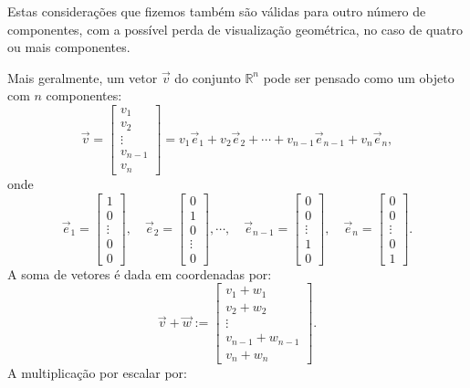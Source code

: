 Estas considerações que fizemos também são válidas para outro número de componentes, com a possível perda de visualização geométrica, no caso de quatro ou mais componentes.

Mais geralmente, um vetor $\vec{v}$ do conjunto $\mathbb{R}^n$ pode ser pensado como um objeto com $n$ componentes:
\begin{equation}
\vec{v} =
\left[
  \begin{array}{c}
    v_1 \\
    v_2 \\
   \vdots \\
    v_{n-1} \\
    v_n
  \end{array}
\right]
= v_1 \vec{e}_1 + v_2 \vec{e}_2 + \cdots + v_{n-1} \vec{e}_{n-1} + v_{n} \vec{e}_{n},
\end{equation} onde
\begin{equation}
\vec{e}_1 =
\left[
  \begin{array}{c}
    1 \\
    0 \\
  \vdots \\
    0 \\
    0
  \end{array}
\right], \quad
\vec{e}_2 =
\left[
  \begin{array}{c}
    0 \\
    1 \\
    0 \\
  \vdots \\
    0
  \end{array}
\right],   \cdots, \quad
\vec{e}_{n-1} =
\left[
  \begin{array}{c}
    0 \\
    0 \\
  \vdots \\
    1 \\
    0
  \end{array}
\right], \quad
\vec{e}_n =
\left[
  \begin{array}{c}
    0 \\
    0 \\
  \vdots \\
    0 \\
    1
  \end{array}
\right].
\end{equation} A soma de vetores é dada em coordenadas por:
\begin{equation}
\vec{v} + \vec{w} :=
\left[
  \begin{array}{c}
    v_1 + w_1 \\
    v_2 + w_2 \\
    \vdots \\
    v_{n-1} + w_{n-1} \\
    v_n + w_n
  \end{array}
\right].
\end{equation} A multiplicação por escalar por:
